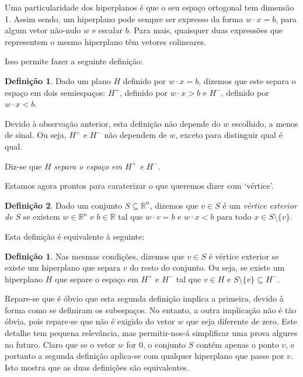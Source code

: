 \documentclass{article}
\newcommand{\R}{\mathbb{R}}
\theoremstyle{definition}
\newtheorem{definition}{Definição}
\newtheorem*{definition*}{Definição}
\begin{document}
	Uma particularidade dos hiperplanos é que o seu espaço ortogonal tem dimensão 1. Assim sendo, um hiperplano pode sempre ser expresso da forma $w \cdot x = b$, para algum vetor não-nulo $w$ e escalar $b$. Para mais, quaisquer duas expressões que representem o mesmo hiperplano têm vetores colineares.
	
	Isso permite fazer a seguinte definição:
	
	\begin{definition}
	Dado um plano $H$ definido por $w \cdot x = b$, dizemos que este separa o espaço em dois semiespaços: $H^+$, definido por $w \cdot x > b$ e $H^-$, definido por $w \cdot x < b$.
	
	Devido à observação anterior, esta definição não depende do $w$ escolhido, a menos de sinal. Ou seja, $H^+$ e $H^-$ não dependem de $w$, exceto para distinguir qual é qual.
	
	Diz-se que $H$ \emph{separa o espaço em $H^+$ e $H^-$}.
	\end{definition}
	
	Estamos agora prontos para caraterizar o que queremos dizer com `vértice'.
	
	\begin{definition}
	Dado um conjunto $S \subseteq \R^n$, dizemos que $v \in S$ é um \emph{vértice exterior de $S$} se existem $w \in \R^n$ e $b \in \R$ tal que $w \cdot v = b$ e $w \cdot x < b$ para todo $x \in S \setminus \{v\}$.
	\end{definition}
	
	Esta definição é equivalente à seguinte:
	
	\begin{definition*}
	Nas mesmas condições, dizemos que $v \in S$ é vértice exterior se existe um hiperplano que separa $v$ do resto do conjunto. Ou seja, se existe um hiperplano $H$ que separe o espaço em $H^+$ e $H^-$ tal que $v \in H$ e $S \setminus \{v\} \subseteq H^-$.
	\end{definition*}
	
	Repare-se que é óbvio que esta segunda definição implica a primeira, devido à forma como se definiram os subespaços. No entanto, a outra implicação não é tão óbvia, pois repare-se que não é exigido do vetor $w$ que seja diferente de zero. Este detalhe tem pequena relevância, mas permitir-nos-á simplificar uma prova algures no futuro. Claro que se o vetor $w$ for $0$, o conjunto $S$ contém apenas o ponto $v$, e portanto a segunda definição aplica-se com qualquer hiperplano que passe por $v$. Isto mostra que as duas definições são equivalentes.
	
\end{document}
